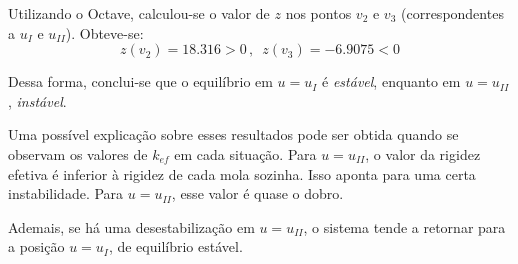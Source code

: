 \documentclass[a4paper, 12pt]{article}
\begin{document}
	Utilizando o Octave, calculou-se o valor de $z$ nos pontos $v_2$ e $v_3$ (correspondentes a $u_I$ e $u_{II}$). Obteve-se:
	$$z(v_2)=18.316>0\,,\,\,\,z(v_3)=-6.9075<0$$
	
	Dessa forma, conclui-se que o equilíbrio em $u=u_I$ é \textit{estável}, enquanto em $u=u_{II}$, \textit{instável}.
	
	Uma possível explicação sobre esses resultados pode ser obtida quando se observam os valores de $k_{ef}$ em cada situação.
	Para $u=u_{II}$, o valor da rigidez efetiva é inferior à rigidez de cada mola sozinha. Isso aponta para uma certa 
	instabilidade. Para $u=u_{II}$, esse valor é quase o dobro.
	
	Ademais, se há uma desestabilização em $u=u_{II}$, o sistema tende a retornar para a posição $u=u_{I}$, de equilíbrio
	estável. 
			
\end{document}
